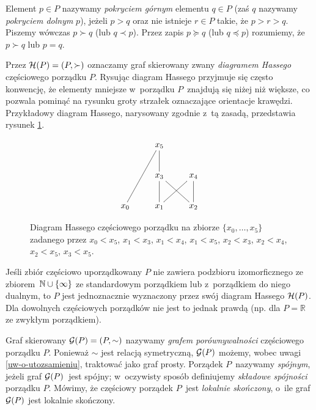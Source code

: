 Element $p\in P$ nazywamy \textit{pokryciem górnym} elementu $q\in P$ (zaś $q$ nazywamy \textit{pokryciem dolnym} $p$), jeżeli $p>q$ oraz nie istnieje $r\in P$ takie, że $p>r>q$. Piszemy wówczas $p\succ q$ (lub $q\prec p$). Przez zapis $p\succeq q$ (lub $q\preceq p$) rozumiemy, że $p\succ q$ lub $p=q$.

Przez $\mathcal{H}(P)=(P,\succ)$ oznaczamy graf skierowany zwany \textit{diagramem Hassego} częściowego porządku $P$. Rysując diagram Hassego przyjmuje się często konwencję, że elementy mniejsze w~porządku $P$~znajdują się niżej niż większe, co pozwala pominąć na rysunku groty strzałek oznaczające orientacje krawędzi. Przykładowy diagram Hassego, narysowany zgodnie z~tą zasadą, przedstawia rysunek \ref{fig-diagram_hassego}.

\begin{figure}[h]
\[\xymatrix{
& x_5\ar@{-}[d]\ar@{-}[ddl]\\
& x_3\ar@{-}[d]\ar@{-}[dr] & x_4\ar@{-}[d]\ar@{-}[dl]\\
x_0 & x_1 & x_2
}\]
\caption{Diagram Hassego częściowego porządku na zbiorze $\{x_0,\ldots,x_5\}$ zadanego przez  $x_0<x_5$, $x_1<x_3$, $x_1<x_4$, $x_1<x_5$, $x_2<x_3$, $x_2<x_4$, $x_2<x_5$, $x_3<x_5$.}\label{fig-diagram_hassego}
\end{figure}

Jeśli zbiór częściowo uporządkowany $P$ nie zawiera podzbioru izomorficznego ze zbiorem~\mbox{$\mathbb{N}\cup\{\infty\}$} ze standardowym porządkiem lub z~porządkiem do niego dualnym, to $P$ jest jednoznacznie wyznaczony przez swój diagram Hassego $\mathcal{H}(P)$. Dla dowolnych częściowych porządków nie jest to jednak prawdą (np. dla $P=\mathbb{R}$ ze zwykłym porządkiem).

Graf skierowany $\mathcal{G}(P)=(P,\sim)$ nazywamy \textit{grafem porównywalności} częściowego porządku $P$. Ponieważ $\sim$ jest relacją symetryczną, $\mathcal{G}(P)$ możemy, wobec uwagi \ref{uw-o-utozsamieniu}, traktować jako graf prosty.
Porządek $P$~nazywamy \textit{spójnym}, jeżeli graf $\mathcal{G}(P)$~jest spójny; w~oczywisty sposób definiujemy \textit{składowe spójności} porządku $P$. Mówimy, że częściowy porządek $P$~jest \textit{lokalnie skończony}, o~ile graf $\mathcal{G}(P)$ jest lokalnie skończony.

